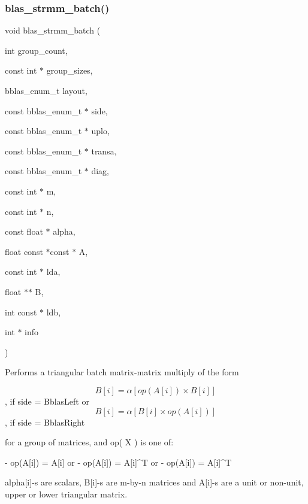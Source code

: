 \subsubsection{\texorpdfstring{blas\+\_\+strmm\+\_\+batch()}{blas\_strmm\_batch()}}
{\footnotesize\ttfamily void blas\+\_\+strmm\+\_\+batch (\begin{DoxyParamCaption}\item[{int}]{group\+\_\+count,  }\item[{const int $\ast$}]{group\+\_\+sizes,  }\item[{bblas\+\_\+enum\+\_\+t}]{layout,  }\item[{const bblas\+\_\+enum\+\_\+t $\ast$}]{side,  }\item[{const bblas\+\_\+enum\+\_\+t $\ast$}]{uplo,  }\item[{const bblas\+\_\+enum\+\_\+t $\ast$}]{transa,  }\item[{const bblas\+\_\+enum\+\_\+t $\ast$}]{diag,  }\item[{const int $\ast$}]{m,  }\item[{const int $\ast$}]{n,  }\item[{const float $\ast$}]{alpha,  }\item[{float const $\ast$const $\ast$}]{A,  }\item[{const int $\ast$}]{lda,  }\item[{float $\ast$$\ast$}]{B,  }\item[{int const $\ast$}]{ldb,  }\item[{int $\ast$}]{info }\end{DoxyParamCaption})}

Performs a triangular batch matrix-\/matrix multiply of the form

\[B[i] = \alpha [op( A[i] ) \times B[i]] \], if side = Bblas\+Left or \[B[i] = \alpha [B[i] \times op( A[i]) ] \], if side = Bblas\+Right

for a group of matrices, and op( X ) is one of\+: \begin{DoxyVerb}    - op(A[i]) = A[i]   or
    - op(A[i]) = A[i]^T or
    - op(A[i]) = A[i]^T
\end{DoxyVerb}


alpha\mbox{[}i\mbox{]}-\/s are scalars, B\mbox{[}i\mbox{]}-\/s are m-\/by-\/n matrices and A\mbox{[}i\mbox{]}-\/s are a unit or non-\/unit, upper or lower triangular matrix.


